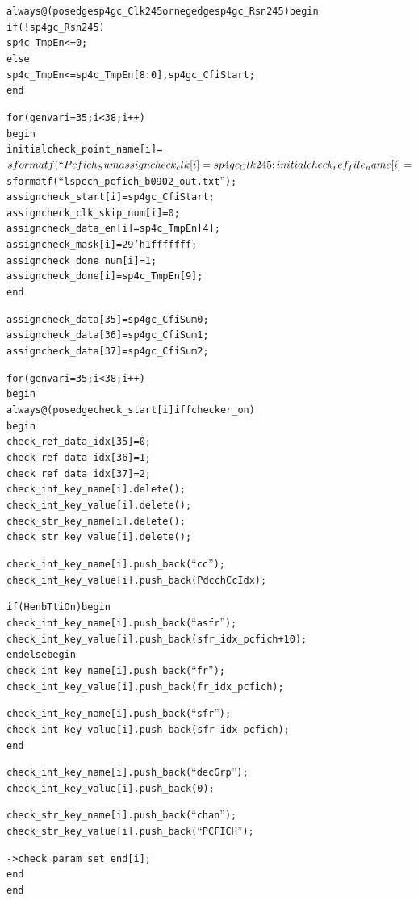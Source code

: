 \documentclass{note}
\begin{document}
\begin{alltt}
  always @ (posedge sp4gc_Clk245 or negedge sp4gc_Rsn245) begin
    if (!sp4gc_Rsn245)
      sp4c_TmpEn <= 0;
    else
      sp4c_TmpEn <= {sp4c_TmpEn[8:0], sp4gc_CfiStart};
  end

  for (genvar i=35;i<38;i++)
  begin
    initial check_point_name[i]     = $sformatf(``Pcfich_Sum%
    assign  check_clk[i]            = sp4gc_Clk245;
    initial check_ref_file_name[i]  = $sformatf(``lspcch_pcfich_b0902_out.txt'');
    assign  check_start[i]          = sp4gc_CfiStart;
    assign  check_clk_skip_num[i]   = 0;
    assign  check_data_en[i]        = sp4c_TmpEn[4];
    assign  check_mask[i]           = 29'h1fffffff;
    assign  check_done_num[i]       = 1;
    assign  check_done[i]           = sp4c_TmpEn[9];
  end

  assign  check_data[35]          = sp4gc_CfiSum0;
  assign  check_data[36]          = sp4gc_CfiSum1;
  assign  check_data[37]          = sp4gc_CfiSum2;

  for (genvar i=35;i<38;i++)
  begin
    always@(posedge check_start[i] iff checker_on)
    begin
      check_ref_data_idx[35] = 0;
      check_ref_data_idx[36] = 1;
      check_ref_data_idx[37] = 2;
      check_int_key_name[i].delete();
      check_int_key_value[i].delete();
      check_str_key_name[i].delete();
      check_str_key_value[i].delete();

      check_int_key_name[i].push_back(``cc'');
      check_int_key_value[i].push_back(PdcchCcIdx);

      if (HenbTtiOn) begin
        check_int_key_name[i].push_back(``asfr'');
        check_int_key_value[i].push_back(sfr_idx_pcfich+10);
      end else begin
        check_int_key_name[i].push_back(``fr'');
        check_int_key_value[i].push_back(fr_idx_pcfich);

        check_int_key_name[i].push_back(``sfr'');
        check_int_key_value[i].push_back(sfr_idx_pcfich);
      end

      check_int_key_name[i].push_back(``decGrp'');
      check_int_key_value[i].push_back(0);

      check_str_key_name[i].push_back(``chan'');
      check_str_key_value[i].push_back(``PCFICH'');

      ->check_param_set_end[i];
    end
  end


\end{alltt}
\end{document}
